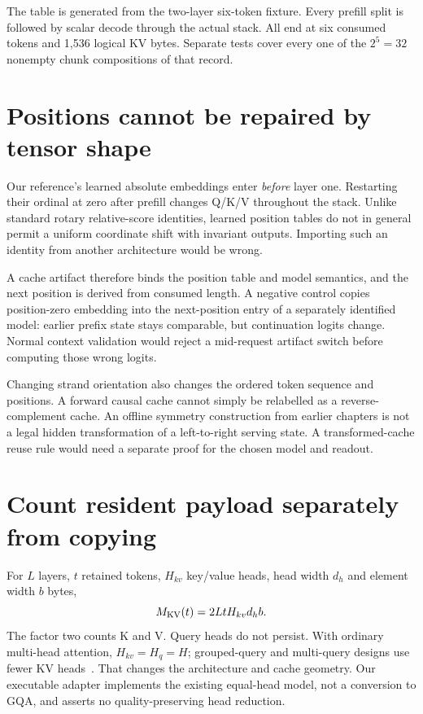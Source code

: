 \begin{center}\end{center}
The table is generated from the two-layer six-token fixture. Every prefill
split is followed by scalar decode through the actual stack. All end at six
consumed tokens and 1,536 logical KV bytes. Separate tests cover every one
of the $2^5=32$ nonempty chunk compositions of that record.

\section{Positions cannot be repaired by tensor shape}
\label{evod35:positions}
Our reference's learned absolute embeddings enter \emph{before} layer one.
Restarting their ordinal at zero after prefill changes Q/K/V throughout the
stack. Unlike standard rotary relative-score identities, learned position
tables do not in general permit a uniform coordinate shift with invariant
outputs. Importing such an identity from another architecture would be wrong.

A cache artifact therefore binds the position table and model semantics,
and the next position is derived from consumed length. A negative control
copies position-zero embedding into the next-position entry of a separately
identified model: earlier prefix state stays comparable, but continuation
logits change. Normal context validation would reject a mid-request artifact
switch before computing those wrong logits.

Changing strand orientation also changes the ordered token sequence and
positions. A forward causal cache cannot simply be relabelled as a
reverse-complement cache. An offline symmetry construction from earlier
chapters is not a legal hidden transformation of a left-to-right serving
state. A transformed-cache reuse rule would need a separate proof for the
chosen model and readout.

\section{Count resident payload separately from copying}
\label{evod35:memory}
For $L$ layers, $t$ retained tokens, $H_{kv}$ key/value heads, head width
$d_h$ and element width $b$ bytes,
\[
 M_{\rm KV}(t)=2LtH_{kv}d_hb.
\]
The factor two counts K and V. Query heads do not persist. With ordinary
multi-head attention, $H_{kv}=H_q=H$; grouped-query and multi-query designs
use fewer KV heads~\cite{gqa}. That changes the architecture and cache
geometry. Our executable adapter implements the existing equal-head model,
not a conversion to GQA, and asserts no quality-preserving head reduction.

